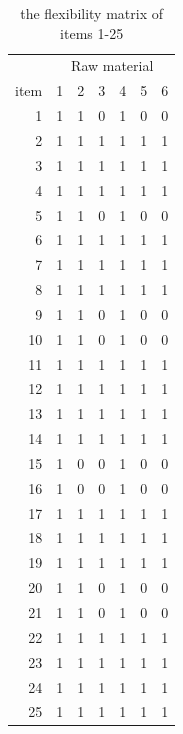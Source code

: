 \documentclass[preprint, 3p,
authoryear]{elsarticle} %
\begin{document}
\begin{table}[!h]

\caption{\label{tab:unnamed-chunk-4}the flexibility matrix of items 1-25}
\centering
\begin{tabular}[t]{r|r|r|r|r|r|r}
\hline
\multicolumn{1}{c|}{ } & \multicolumn{6}{c}{Raw material} \\
\cline{2-7}
item & 1 & 2 & 3 & 4 & 5 & 6\\
\hline
1 & 1 & 1 & 0 & 1 & 0 & 0\\
\hline
2 & 1 & 1 & 1 & 1 & 1 & 1\\
\hline
3 & 1 & 1 & 1 & 1 & 1 & 1\\
\hline
4 & 1 & 1 & 1 & 1 & 1 & 1\\
\hline
5 & 1 & 1 & 0 & 1 & 0 & 0\\
\hline
6 & 1 & 1 & 1 & 1 & 1 & 1\\
\hline
7 & 1 & 1 & 1 & 1 & 1 & 1\\
\hline
8 & 1 & 1 & 1 & 1 & 1 & 1\\
\hline
9 & 1 & 1 & 0 & 1 & 0 & 0\\
\hline
10 & 1 & 1 & 0 & 1 & 0 & 0\\
\hline
11 & 1 & 1 & 1 & 1 & 1 & 1\\
\hline
12 & 1 & 1 & 1 & 1 & 1 & 1\\
\hline
13 & 1 & 1 & 1 & 1 & 1 & 1\\
\hline
14 & 1 & 1 & 1 & 1 & 1 & 1\\
\hline
15 & 1 & 0 & 0 & 1 & 0 & 0\\
\hline
16 & 1 & 0 & 0 & 1 & 0 & 0\\
\hline
17 & 1 & 1 & 1 & 1 & 1 & 1\\
\hline
18 & 1 & 1 & 1 & 1 & 1 & 1\\
\hline
19 & 1 & 1 & 1 & 1 & 1 & 1\\
\hline
20 & 1 & 1 & 0 & 1 & 0 & 0\\
\hline
21 & 1 & 1 & 0 & 1 & 0 & 0\\
\hline
22 & 1 & 1 & 1 & 1 & 1 & 1\\
\hline
23 & 1 & 1 & 1 & 1 & 1 & 1\\
\hline
24 & 1 & 1 & 1 & 1 & 1 & 1\\
\hline
25 & 1 & 1 & 1 & 1 & 1 & 1\\
\hline
\end{tabular}
\end{table}
\pagebreak
\end{document}
